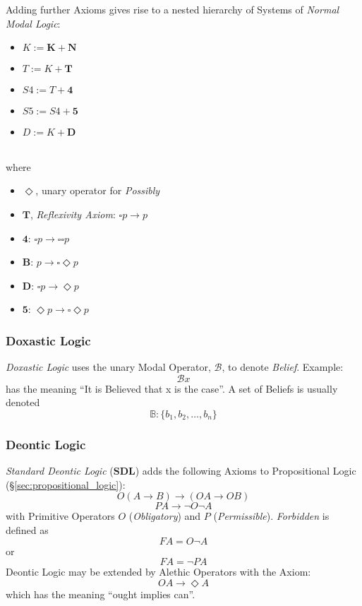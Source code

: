 Adding further Axioms gives rise to a nested hierarchy of Systems of
\emph{Normal Modal Logic}:

\begin{itemize}
\item $K := \mathbf{K} + \mathbf{N}$
\item $T := K + \mathbf{T}$
\item $S4 := T + \mathbf{4}$
\item $S5 := S4 + \mathbf{5}$
\item $D := K + \mathbf{D}$
\end{itemize} \hfill \\
where

\begin{itemize}
\item $\Diamond$, unary operator for \emph{Possibly}
\item $\mathbf{T}$, \emph{Reflexivity Axiom}: $\square p \rightarrow p$
\item $\mathbf{4}$: $\square p \rightarrow \square \square p$
\item $\mathbf{B}$: $p \rightarrow \square \Diamond p$
\item $\mathbf{D}$: $\square p \rightarrow \Diamond p$
\item $\mathbf{5}$: $\Diamond p \rightarrow \square \Diamond p$
\end{itemize}

\subsubsection{Doxastic Logic}

\emph{Doxastic Logic} uses the unary Modal Operator, $\mathcal{B}$, to
denote \emph{Belief}. Example:
\[
    \mathcal{B} x
\]
has the meaning ``It is Believed that x is the case''. A set of
Beliefs is usually denoted
\[
    \mathbb{B}: \{ b_1, b_2, \ldots, b_n \}
\]

\subsubsection{Deontic Logic}

\emph{Standard Deontic Logic} ($\mathbf{SDL}$) adds the following
Axioms to Propositional Logic (\S\ref{sec:propositional_logic}):
    \[O(A \rightarrow B) \rightarrow (OA \rightarrow OB)\]
    \[PA \rightarrow \neg O \neg A\]
with Primitive Operators $O$ (\emph{Obligatory}) and $P$
(\emph{Permissible}). \emph{Forbidden} is defined as
    \[FA = O \neg A\]
or
    \[FA = \neg P A\]
Deontic Logic may be extended by Alethic Operators with the Axiom:
    \[OA \rightarrow \Diamond A\]
which has the meaning ``ought implies can''.

